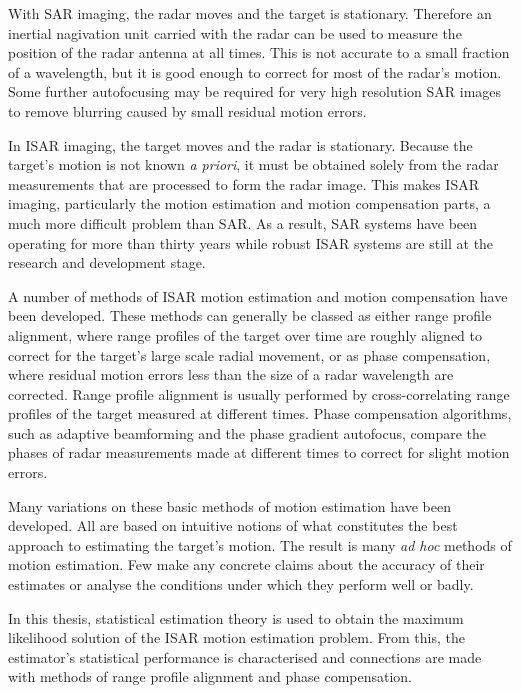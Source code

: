 With SAR imaging, the radar moves and the target is stationary.  Therefore
an inertial nagivation unit carried with the radar can be used to measure
the position of the radar antenna at all times.  This is not accurate to a
small fraction of a wavelength, but it is good enough to correct for most
of the radar's motion.  Some further autofocusing may be required for very
high resolution SAR images to remove blurring caused by small residual
motion errors. 

In ISAR imaging, the target moves and the radar is stationary.  Because the
target's motion is not known {\em a priori\/}, it must be obtained solely
from the radar measurements that are processed to form the radar image. 
This makes ISAR imaging, particularly the motion estimation and motion
compensation parts, a much more difficult problem than SAR.  As a result,
SAR systems have been operating for more than thirty years while robust
ISAR systems are still at the research and development stage.  

A number of methods of ISAR motion estimation and motion compensation have
been developed.  These methods can generally be classed as either range
profile alignment, where range profiles of the target over time are roughly
aligned to correct for the target's large scale radial movement, or as
phase compensation, where residual motion errors less than the size of a
radar wavelength are corrected.  Range profile alignment is usually
performed by cross-correlating range profiles of the target measured at
different times.  Phase compensation algorithms, such as adaptive
beamforming and the phase gradient autofocus, compare the phases of radar
measurements made at different times to correct for slight motion errors.  

Many variations on these basic methods of motion estimation have been
developed.  All are based on intuitive notions of what constitutes the best
approach to estimating the target's motion.  The result is many {\em ad
hoc\/} methods of motion estimation.  Few make any concrete claims about
the accuracy of their estimates or analyse the conditions under which they
perform well or badly.

In this thesis, statistical estimation theory is used to obtain the maximum
likelihood solution of the ISAR motion estimation problem.  From this, the
estimator's statistical performance is characterised and connections are made
with methods of range profile alignment and phase compensation.

